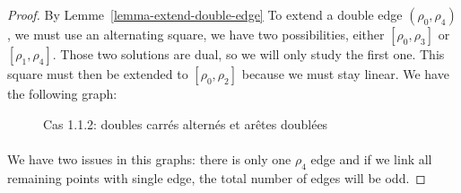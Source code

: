 \begin{proof}
  By Lemme~\ref{lemma-extend-double-edge}
  To extend a double edge $(\rho_0, \rho_4)$, we must use an alternating square, we have two possibilities, either $[\rho_0, \rho_3]$ or $[\rho_1, \rho_4]$. Those two solutions are dual, so we will only study the first one. This square must then be extended to $[\rho_0, \rho_2]$ because we must stay linear. We have the following graph:

  \begin{figure}[H]
    \begin{center}
      \caption{Cas 1.1.2: doubles carrés alternés et arêtes doublées}
    \end{center}
  \end{figure}

  \paragraph{}
  We have two issues in this graphs: there is only one $\rho_4$ edge and if we link all remaining points with single edge, the total number of edges will be odd.


\end{proof}
